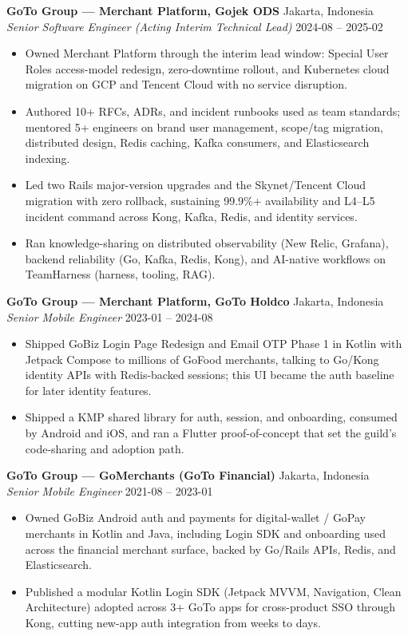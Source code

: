 \documentclass[11pt]{article}
\begin{document}
\textbf{GoTo Group — Merchant Platform, Gojek ODS} \hfill Jakarta, Indonesia\\
\textit{Senior Software Engineer (Acting Interim Technical Lead)} \hfill 2024-08 -- 2025-02\\
\begin{itemize}
\item Owned Merchant Platform through the interim lead window: Special User Roles access-model redesign, zero-downtime rollout, and Kubernetes cloud migration on GCP and Tencent Cloud with no service disruption.
\item Authored 10+ RFCs, ADRs, and incident runbooks used as team standards; mentored 5+ engineers on brand user management, scope/tag migration, distributed design, Redis caching, Kafka consumers, and Elasticsearch indexing.
\item Led two Rails major-version upgrades and the Skynet/Tencent Cloud migration with zero rollback, sustaining 99.9\%+ availability and L4–L5 incident command across Kong, Kafka, Redis, and identity services.
\item Ran knowledge-sharing on distributed observability (New Relic, Grafana), backend reliability (Go, Kafka, Redis, Kong), and AI-native workflows on TeamHarness (harness, tooling, RAG).
\end{itemize}

\textbf{GoTo Group — Merchant Platform, GoTo Holdco} \hfill Jakarta, Indonesia\\
\textit{Senior Mobile Engineer} \hfill 2023-01 -- 2024-08\\
\begin{itemize}
\item Shipped GoBiz Login Page Redesign and Email OTP Phase 1 in Kotlin with Jetpack Compose to millions of GoFood merchants, talking to Go/Kong identity APIs with Redis-backed sessions; this UI became the auth baseline for later identity features.
\item Shipped a KMP shared library for auth, session, and onboarding, consumed by Android and iOS, and ran a Flutter proof-of-concept that set the guild's code-sharing and adoption path.
\end{itemize}

\textbf{GoTo Group — GoMerchants (GoTo Financial)} \hfill Jakarta, Indonesia\\
\textit{Senior Mobile Engineer} \hfill 2021-08 -- 2023-01\\
\begin{itemize}
\item Owned GoBiz Android auth and payments for digital-wallet / GoPay merchants in Kotlin and Java, including Login SDK and onboarding used across the financial merchant surface, backed by Go/Rails APIs, Redis, and Elasticsearch.
\item Published a modular Kotlin Login SDK (Jetpack MVVM, Navigation, Clean Architecture) adopted across 3+ GoTo apps for cross-product SSO through Kong, cutting new-app auth integration from weeks to days.
\end{itemize}
\end{document}
